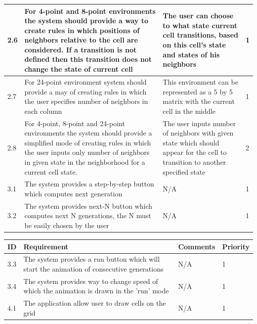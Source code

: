 \documentclass{article}
\begin{document}
\begin{center}
\begin{tabular}{| l | p{7cm} | p{5cm} | l |}
		2.6 &
		For 4-point and 8-point environments the system should provide a way to create rules
		in which positions of neighbors relative to the cell are considered. If
		a transition is not defined then this transition does not change the state of current cell
		 &
		The user can choose to what state current cell transitions, based on this cell's state 
		and states of his neighbors &
		1 
		\\ \hline

		2.7 &
		For 24-point environment system should provide a may of creating rules in which 
		the user specifies number of neighbors in each column
		&	
		This environment can be represented as a 5 by 5 matrix with the current cell in the middle &
		1 
		\\ \hline

		2.8 &
		For 4-point, 8-point and 24-point environments the system should provide a simplified
		mode of creating rules in which the user inputs only number of neighbors in given state
		in the neighborhood for a current cell state. &
		The user inputs number of neighbors with given state which should appear for the
		cell to transition to another specified state &
		2 
		\\ \hline
				
		3.1 & 
		The system provides a step-by-step button which computes next generation & 
		N/A &
		1 
		\\ \hline
		
		3.2 & 
		The system provides next-N button which computes next N generations,
		the N must be easily chosen by the user & 
		N/A &
		1
		\\ \hline



	\end{tabular}

	\begin{tabular}{| l | p{7cm} | p{5cm} | l |}
		\hline
	  	ID & Requirement & Comments & Priority \\
	
		\hline
		3.3 & 
		The system provides a run button which will
		start the animation of consecutive generations & 
		N/A &
		1
		\\ \hline
		
		3.4 & 
		The system provides way to change speed of which the animation is drawn in the 'run' mode & 
		N/A &
		1
		\\ \hline

		4.1 & 
		The application allow user to draw cells on the grid & 
		N/A &
		1
		\\ \hline		


\end{tabular}
\end{center}
\end{document}
